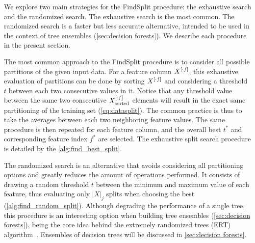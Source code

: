 We explore two main strategies for the FindSplit procedure: the exhaustive search and the randomized search. The exhaustive search is the most common. The randomized search is a faster but less accurate alternative, intended to be used in the context of tree ensembles (\autoref{sec:decision forests}). We describe each procedure in the present section.

The most common approach to the FindSplit procedure is to consider all possible partitions of the given input data.
%
For a feature column $X^{[\cdot f]}$, this exhaustive evaluation of partitions can be done by sorting $X^{[\cdot f]}$ and considering a threshold $t$ between each two consecutive values in it. Notice that any threshold value between the same two consecutive $X^{[\cdot f]}_\text{sorted}$ elements will result in the exact same partitioning of the training set (\autoref{eq:datasplit}). The common practice is thus to take the averages between each two neighboring feature values. The same procedure is then repeated for each feature column, and the overall best $t^\ast$ and corresponding feature index $f^\ast$ are selected.
%
%
The exhaustive split search procedure is detailed by the \autoref{alg:find_best_split}.

\algFindBestSplit

The randomized search is an alternative that avoids considering all partitioning options and greatly reduces the amount of operations performed.
It consists of drawing a random threshold $t$ between the minimum and maximum value of each feature, thus evaluating only $|X|_j$ splits when choosing the best (\autoref{alg:find_random_split}). Although degrading the performance of a single tree, this procedure is an interesting option when building tree ensembles (\autoref{sec:decision forests}), being the core idea behind the extremely randomized trees (ERT) algorithm~\cite{geurts2006extremely}.  %
Ensembles of decision trees will be discussed in \autoref{sec:decision forests}.

